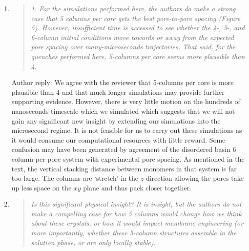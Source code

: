 \documentclass{article}
\begin{document}
\begin{enumerate}
\begin{quote}
	
	\end{quote}
	
	\item \begin{quote}
    \textit{1. For the simulations performed here, the authors do make a strong case that 5 columns per
    core gets the best pore-to-pore spacing (Figure 5). However, insufficient time is accessed to see 
    whether the 4-, 5-, and 6-column initial conditions move towards or away from the expected pore 
    spacing over many-microseconds trajectories. That said, for the quenches performed here, 5-columns
    per core seems more plausible than 4.}
	\end{quote}
	
	Author reply: We agree with the reviewer that 5-columns per core is more plausible than 4 and that much
    longer simulations may provide further supporting evidence. However, there is very little motion on
    the hundreds of nanoseconds timescale which we simulated which suggests that we will not gain any 
    significant new insight by extending our simulations into the microsecond regime. It is not feasible 
    for us to carry out these simulations as it would consume our computational resources with little reward.
    Some confusion may have been generated by agreement of the disordered basin 6 column-per-pore system
    with experimental pore spacing. As mentioned in the text, the vertical stacking distance between monomers
    in that system is far too large. The columns are `stretch' in the $z$-direction allowing the pores take
    up less space on the $xy$ plane and thus pack closer together.  
    
	\item \begin{quote}    
    \textit{Is this significant physical insight? It is insight, but the
    authors do not make a compelling case for how 5 columns would change how we think about these crystals,
    or how it would impact membrane engineering (or more importantly, whether these 5-column structures
    assemble in the solution phase, or are only locally stable).}
    \end{quote}
    

\end{enumerate}
\end{document}
